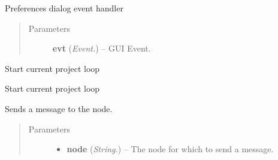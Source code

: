 \documentclass[letterpaper,10pt,english]{sphinxmanual}
\begin{document}
\begin{fulllineitems}
\begin{fulllineitems}
\begin{quote}
\begin{description}
\end{description}\end{quote}

\end{fulllineitems}


\begin{fulllineitems}
\label{api:wos.GUI.ShowPreferences}
Preferences dialog event handler
\begin{quote}\begin{description}
\item[{Parameters}] \leavevmode
\textbf{evt} (\emph{Event.}) -- GUI Event.

\end{description}\end{quote}

\end{fulllineitems}


\begin{fulllineitems}
\label{api:wos.GUI.StartCurrentProject}
Start current project loop

\end{fulllineitems}


\begin{fulllineitems}
\label{api:wos.GUI.StartCurrentSession}
Start current project loop

\end{fulllineitems}


\begin{fulllineitems}
\label{api:wos.GUI.SwnpSend}
Sends a message to the node.
\begin{quote}\begin{description}
\item[{Parameters}] \leavevmode\begin{itemize}
\item {} 
\textbf{node} (\emph{String.}) -- The node for which to send a message.


\end{itemize}
\end{description}
\end{quote}
\end{fulllineitems}
\end{fulllineitems}
\end{document}
